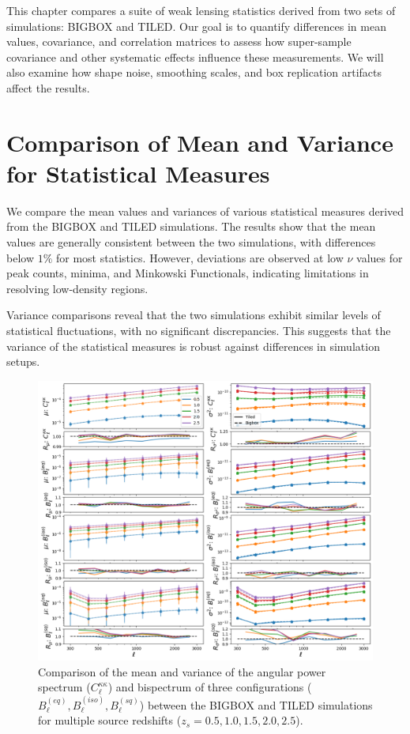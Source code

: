 This chapter compares a suite of weak lensing statistics derived from two sets of simulations: BIGBOX and TILED. Our goal is to quantify differences in mean values, covariance, and correlation matrices to assess how super-sample covariance and other systematic effects influence these measurements. We will also examine how shape noise, smoothing scales, and box replication artifacts affect the results.

\section{Comparison of Mean and Variance for Statistical Measures}
We compare the mean values and variances of various statistical measures derived from the BIGBOX and TILED simulations. The results show that the mean values are generally consistent between the two simulations, with differences below $1\%$ for most statistics. However, deviations are observed at low $\nu$ values for peak counts, minima, and Minkowski Functionals, indicating limitations in resolving low-density regions.

Variance comparisons reveal that the two simulations exhibit similar levels of statistical fluctuations, with no significant discrepancies. This suggests that the variance of the statistical measures is robust against differences in simulation setups.

\begin{figure}[ht]
    \centering
    \includegraphics[width=\textwidth]{figures/results/ell_main.png}
    \caption[Comparison of the mean and variance of $C^{\kappa\kappa}_{\ell}$ and Bispectrum]{Comparison of the mean and variance of the angular power spectrum ($C^{\kappa\kappa}_{\ell}$) and bispectrum of three configurations ($B_{\ell}^{(eq)}, B_{\ell}^{(iso)}, B_{\ell}^{(sq)}$) between the BIGBOX and TILED simulations for multiple source redshifts ($z_s = 0.5, 1.0, 1.5, 2.0, 2.5$).}
    \label{fig:ell_main}
\end{figure}

